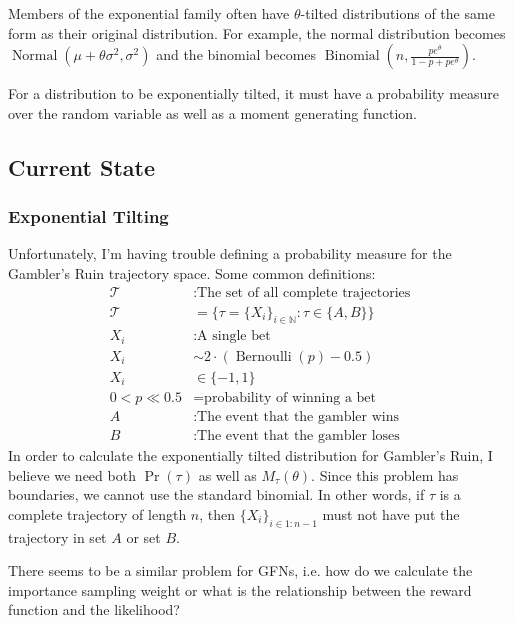 \documentclass[12pt]{article}
\begin{document}
Members of the exponential family often have $\theta$-tilted distributions of
the same form as their original distribution. For example, the normal
distribution becomes
$\operatorname{Normal}\left(\mu+\theta\sigma^2,\sigma^2\right)$ and the binomial
becomes $\operatorname{Binomial}\left(n,\frac{pe^\theta}{1-p+pe^\theta}\right)$.
\par
For a distribution to be exponentially tilted, it must have a probability
measure over the random variable as well as a moment generating function.

\newpage
\subsection*{Current State}
\subsubsection*{Exponential Tilting}
Unfortunately, I'm having trouble defining a probability measure for the
Gambler's Ruin trajectory space. Some common definitions:
\[
  \begin{aligned}
    \mathcal{T}
    &:\text{The set of all complete trajectories}
    \\ \mathcal{T} &=\{\tau = \{X_i\}_{i\in\mathbb{N}}: \tau\in \{A,B\}\}
    \\ X_i
    &:\text{A single bet}
    \\X_i &\sim 2\cdot(\operatorname{Bernoulli}\left(p\right)-0.5)
    \\X_i &\in \{-1, 1\} 
    \\ 0 < p \ll 0.5
    &=\text{probability of winning a bet}
    \\ A
    &:\text{The event that the gambler wins}
    \\ B
    &:\text{The event that the gambler loses}
  \end{aligned}
\]
In order to calculate the exponentially tilted distribution for Gambler's Ruin,
I believe we need both $\Pr(\tau)$ as well as $M_\tau(\theta)$. Since this
problem has boundaries, we cannot use the standard binomial. In other words, if
$\tau$ is a complete trajectory of length $n$, then $\{X_i\}_{i\in 1:n-1}$ must
not have put the trajectory in set $A$ or set $B$. 
\par
There seems to be a similar problem for GFNs, i.e. how do we calculate the
importance sampling weight or what is the relationship between the reward
function and the likelihood?
\end{document}
